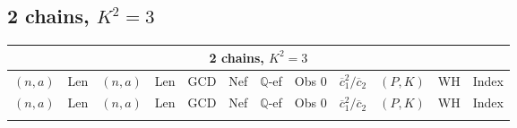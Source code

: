 \subsection{2 chains, $K^2 = 3$}
\begin{longtable}{|c|c|c|c|c|c|c|c|c|c|c|c|}
\hline
\multicolumn{12}{|c|}{2 chains, $K^2 = 3$}\\
\hline
$(n,a)$ & Len & $(n,a)$ & Len & GCD & Nef & $\mathbb Q$-ef & Obs 0 & $\overline c_1^2 / \overline c_2$ & $(P,K)$ & WH & Index\\
\hline
\endfirsthead

\hline
$(n,a)$ & Len & $(n,a)$ & Len & GCD & Nef & $\mathbb Q$-ef & Obs 0 & $\overline c_1^2 / \overline c_2$ & $(P,K)$ & WH & Index\\
\hline
\endhead
\hline
\endfoot


\end{longtable}
